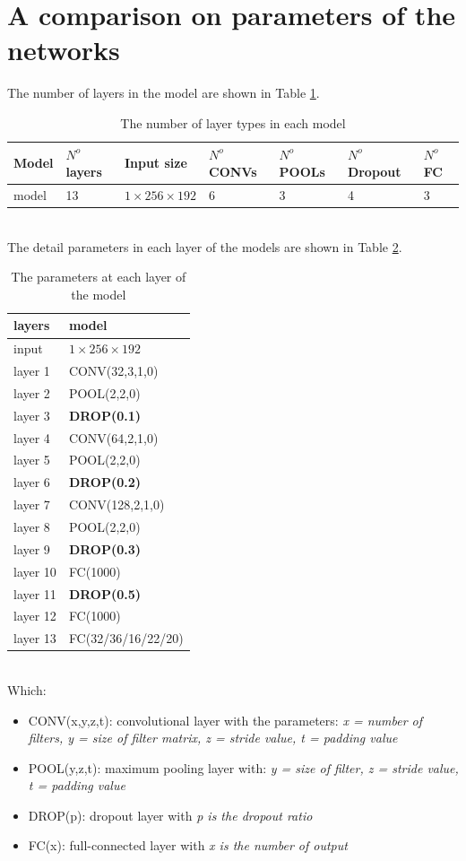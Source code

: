 \documentclass[12pt,a4paper]{article}
\begin{document}
\section{A comparison on parameters of the networks}
\label{apa}
The number of layers in the model are shown in Table \ref{numlayers}.
\begin{table}[h!]
	\centering
	\begin{tabular}{l p{1.2cm} p{3cm} p{2cm} p{1.2cm} p{2cm} p{2cm}}
		Model & $N^o$ layers & Input size & $N^o$ CONVs & $N^o$ POOLs & $N^o$ Dropout & $N^o$ FC \\ \hline
		model & 13 & $1 \times 256 \times 192$ & 6 & 3 & 4 & 3 \\ \hline
	\end{tabular}
	\caption{The number of layer types in each model}
	\label{numlayers}
\end{table}~\\
The detail parameters in each layer of the models are shown in Table \ref{modelparameters}.
\begin{table}[h!]
	\centering
	\begin{tabular}{l p{3cm} }
		layers &  model  \\ \hline
		input & $1 \times 256 \times 192$ \\ \hline
 		layer 1 & CONV(32,3,1,0) \\ \hline
		layer 2 & POOL(2,2,0) \\ \hline
		layer 3 & \textbf{DROP(0.1)} \\ \hline
		layer 4 & CONV(64,2,1,0) \\ \hline
		layer 5 & POOL(2,2,0) \\ \hline
		layer 6 & \textbf{DROP(0.2)} \\ \hline
		layer 7 & CONV(128,2,1,0) \\ \hline
		layer 8 & POOL(2,2,0) \\ \hline
		layer 9 & \textbf{DROP(0.3)} \\ \hline
		layer 10 & FC(1000) \\ \hline
		layer 11 & \textbf{DROP(0.5)} \\ \hline
		layer 12& FC(1000) \\ \hline
		layer 13 & FC(32/36/16/22/20) \\ \hline
	\end{tabular}
	\caption{The parameters at each layer of the model}
	\label{modelparameters}
\end{table}~\\
Which:
\begin{itemize}
	\item CONV(x,y,z,t): convolutional layer with the parameters: \textit{x = number of filters, y = size of filter matrix, z = stride value, t = padding value}
	\item POOL(y,z,t): maximum pooling layer with: \textit{y = size of filter, z = stride value, t = padding value}
	\item DROP(p): dropout layer with \textit{p is the dropout ratio}
	\item FC(x): full-connected layer with \textit{x is the number of output}
\end{itemize}
\end{document}
